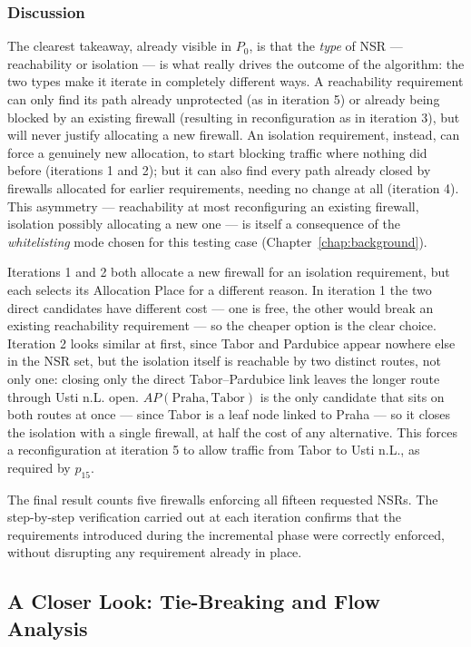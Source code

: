 \subsubsection{Discussion}

The clearest takeaway, already visible in $P_0$, is that the \emph{type} of NSR — reachability or isolation — is what really drives the outcome of the algorithm: the two types make it iterate in completely different ways. A reachability requirement can only find its path already unprotected (as in iteration 5) or already being blocked by an existing firewall (resulting in reconfiguration as in iteration 3), but will never justify allocating a new firewall. An isolation requirement, instead, can force a genuinely new allocation, to start blocking traffic where nothing did before (iterations 1 and 2); but it can also find every path already closed by firewalls allocated for earlier requirements, needing no change at all (iteration 4). This asymmetry — reachability at most reconfiguring an existing firewall, isolation possibly allocating a new one — is itself a consequence of the \textit{whitelisting} mode chosen for this testing case (Chapter~\ref{chap:background}).

Iterations 1 and 2 both allocate a new firewall for an isolation requirement, but each selects its Allocation Place for a different reason. In iteration 1 the two direct candidates have different cost — one is free, the other would break an existing reachability requirement — so the cheaper option is the clear choice. Iteration 2 looks similar at first, since Tabor and Pardubice appear nowhere else in the NSR set, but the isolation itself is reachable by two distinct routes, not only one: closing only the direct Tabor--Pardubice link leaves the longer route through Usti n.L. open. $\mathit{AP}(\text{Praha},\text{Tabor})$ is the only candidate that sits on both routes at once — since Tabor is a leaf node linked to Praha — so it closes the isolation with a single firewall, at half the cost of any alternative. This forces a reconfiguration at iteration 5 to allow traffic from Tabor to Usti n.L., as required by $p_{15}$.

The final result counts five firewalls enforcing all fifteen requested NSRs. The step-by-step verification carried out at each iteration confirms that the requirements introduced during the incremental phase were correctly enforced, without disrupting any requirement already in place.

\subsection{A Closer Look: Tie-Breaking and Flow Analysis}
\label{sec:tie-breaking-closer-look}


